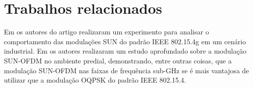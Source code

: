 \section{Trabalhos relacionados}
 {Em \cite{tuset2020dataset} os autores do artigo realizaram um experimento para analisar o comportamento das modulações SUN do padrão IEEE 802.15.4g em um cenário industrial. Em  \cite{munoz2018overview} os autores realizaram um estudo aprofundado sobre a modulação SUN-OFDM no ambiente predial, demonstrando, entre outras coisas, que a modulação SUN-OFDM nas faixas de frequência sub-GHz se é mais vantajosa de utilizar que a modulação OQPSK do padrão IEEE 802.15.4.}
